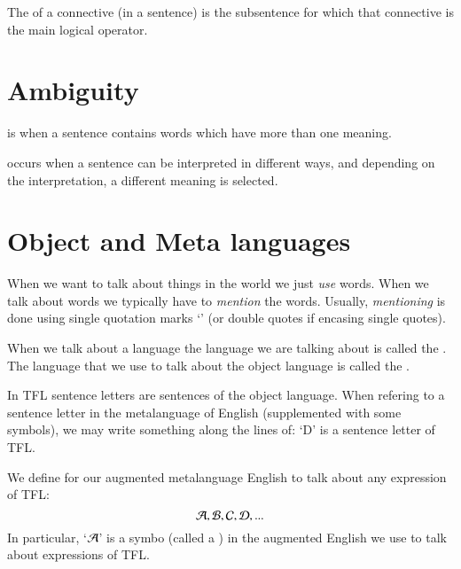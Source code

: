 \begin{definition}
    The  of a connective (in a sentence) is the subsentence for which that connective is the main logical operator.
\end{definition}




\section{ Ambiguity}

\begin{definition}
     is when a sentence contains words which have more than one meaning.
\end{definition}

\begin{definition}
     occurs when a sentence can be interpreted in different ways, and depending on the interpretation, a different meaning is selected.
\end{definition}


\section{ Object and Meta languages}

\begin{remark}
    When we want to talk about things in the world we just \emph{use} words. When we talk about words we typically have to \emph{mention} the words. Usually, \emph{mentioning} is done using single quotation marks `' (or double quotes if encasing single quotes).
\end{remark}


\begin{definition}
    When we talk about a language the language we are talking about is called the . The language that we use to talk about the object language is called the .
\end{definition}

\begin{remark}
    In TFL sentence letters are sentences of the object language. When refering to a sentence letter in the metalanguage of English (supplemented with some symbols), we may write something along the lines of: `D' is a sentence letter of TFL.
\end{remark}


\begin{definition}
    We define  for our augmented metalanguage English to talk about any expression of TFL: \begin{equation}
        \mathcal{A},\mathcal{B},\mathcal{C},\mathcal{D},...
    \end{equation}
    In particular, `$\mathcal{A}$' is a symbo (called a ) in the augmented English we use to talk about expressions of TFL.
\end{definition}

